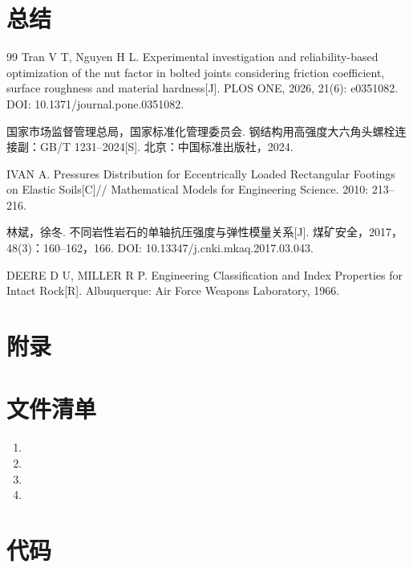 \documentclass[UTF-8,a4paper,zihao=-4]{ctexart}
\begin{document}
\section{总结}

\begin{thebibliography}{99}   %
Tran V T, Nguyen H L.
Experimental investigation and reliability-based optimization of the nut factor in bolted joints considering friction coefficient, surface roughness and material hardness[J].
PLOS ONE, 2026, 21(6): e0351082.
DOI: 10.1371/journal.pone.0351082.

国家市场监督管理总局，国家标准化管理委员会.
钢结构用高强度大六角头螺栓连接副：GB/T 1231--2024[S].
北京：中国标准出版社，2024.

IVAN A.
Pressures Distribution for Eccentrically Loaded Rectangular
Footings on Elastic Soils[C]//
Mathematical Models for Engineering Science.
2010: 213--216.

林斌，徐冬.
不同岩性岩石的单轴抗压强度与弹性模量关系[J].
煤矿安全，2017，48(3)：160--162，166.
DOI: 10.13347/j.cnki.mkaq.2017.03.043.

DEERE D U, MILLER R P.
Engineering Classification and Index Properties for Intact Rock[R].
Albuquerque: Air Force Weapons Laboratory, 1966.

\end{thebibliography}

\section*{附录}
\appendix

\section{文件清单}

\begin{enumerate}
    \item 
    \item 
    \item 
    \item 
\end{enumerate}

\section{代码}

\end{document}
